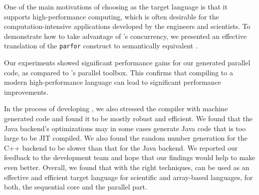 One of the main motivations of choosing \xten as the target language is
that it supports high-performance computing,  which is often desirable
for the computation-intensive applications developed by the engineers
and scientists.   To demonstrate how to take advantage of \xten's
concurrency, we presented 
an effective translation of the \matlab \texttt{parfor} construct to
semantically equivalent \xten.    

Our experiments showed significant performance gains for our generated
parallel \xten code, as compared to \matlab's parallel toolbox. This
confirms that compiling \matlab to a modern high-performance language
can lead to significant performance improvements. 

In the process of developing \mixten, we also stressed the \xten compiler with
machine generated code and found it to be mostly robust and efficient. We found
that the \xten Java backend's optimizations may in some cases generate Java code
that is too large to be JIT compiled. We also found the random number generation
for the C++ backend to be slower than that for the Java backend. We reported our
feedback to the \xten development team and hope that our findings would help to
make \xten even better. Overall, we found that with the right techniques, \xten
can be used as an effective and efficient target language for scientific and
array-based languages, for both, the sequential core and the parallel part.   

